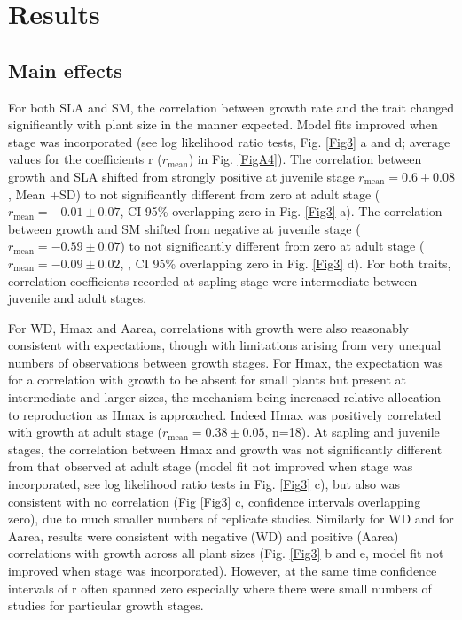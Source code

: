 \documentclass[a4paper]{article}\usepackage[]{graphicx}\usepackage[]{color}
\begin{document}
\section*{Results}\label{results}

\subsection*{Main effects}

For both SLA and SM, the correlation between growth rate and the trait changed significantly with plant size in the manner expected. Model fits improved when stage was incorporated (see log likelihood ratio tests, Fig. \ref{Fig3} a and d; average values for the coefficients r ($r_{\textrm{mean}}$) in Fig. \ref{FigA4}). The correlation between growth and SLA shifted from strongly positive at juvenile stage $r_{\textrm{mean}}=0.6 \pm 0.08$, Mean +SD) to not significantly different from zero at adult stage ($r_{\textrm{mean}}= -0.01 \pm 0.07$, CI 95\% overlapping zero in Fig. \ref{Fig3} a). The correlation between growth and SM shifted from negative at juvenile stage ($r_{\textrm{mean}}= -0.59 \pm 0.07$) to not significantly different from zero at adult stage ($r_{\textrm{mean}}= -0.09 \pm 0.02$, , CI 95\% overlapping zero in Fig. \ref{Fig3} d). For both traits, correlation coefficients recorded at sapling stage were intermediate between juvenile and adult stages. 

For WD, Hmax and Aarea, correlations with growth were also reasonably consistent with expectations, though with limitations arising from very unequal numbers of observations between growth stages. For Hmax, the expectation was for a correlation with growth to be absent for small plants but present at intermediate and larger sizes, the mechanism being increased relative allocation to reproduction as Hmax is approached. Indeed Hmax was positively correlated with growth at adult stage ($r_{\textrm{mean}}= 0.38 \pm 0.05$, n=18). At sapling and juvenile stages, the correlation between Hmax and growth was not significantly different from that observed at adult stage (model fit not improved when stage was incorporated, see log likelihood ratio tests in Fig. \ref{Fig3} c), but also was consistent with no correlation (Fig \ref{Fig3} c, confidence intervals overlapping zero), due to much smaller numbers of replicate studies. Similarly for WD and for Aarea, results were consistent with negative (WD) and positive (Aarea) correlations with growth across all plant sizes (Fig. \ref{Fig3} b and e, model fit not improved when stage was incorporated). However, at the same time confidence intervals of r often spanned zero especially where there were small numbers of studies for particular growth stages. 
\end{document}
